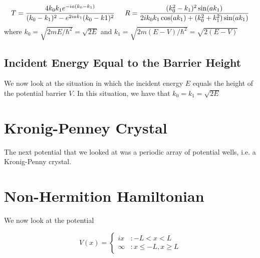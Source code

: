 \documentclass{article}
\begin{document}
\begin{equation}
T = \frac{4k_0 k_1 e^{-ia(k_0-k_1)}}{(k_0 - k_1)^2 - e^{2iak_1}(k_0-k1)^2} \hspace{0.2in} R = \frac{(k_0^2-k_1)^2\sin(ak_1)}{2ik_0k_1\cos(ak_1)+(k_0^2+k_1^2)\sin(ak_1)}
\end{equation}
%
where $k_0 = \sqrt{2mE/\hbar^2} = \sqrt{2E}$ and $k_1 = \sqrt{2m(E-V)/\hbar^2} = \sqrt{2(E-V)}$
\subsection{Incident Energy Equal to the Barrier Height}

We now look at the situation in which the incident energy $E$ equals the height of the potential barrier $V$. In this situation, we have that $k_0 = k_1 = \sqrt{2E} $

\section{Kronig-Penney Crystal}

The next potential that we looked at was a periodic array of potential wells, i.e. a Kronig-Penny crystal. 

\section{Non-Hermition Hamiltonian}

We now look at the potential 

\[V(x) = \left\{
  \begin{array}{lr}
    ix &  : -L < x  < L \\
    \infty & : x \leq -L , x \geq L 
  \end{array}
\right.
\]
\end{document}
